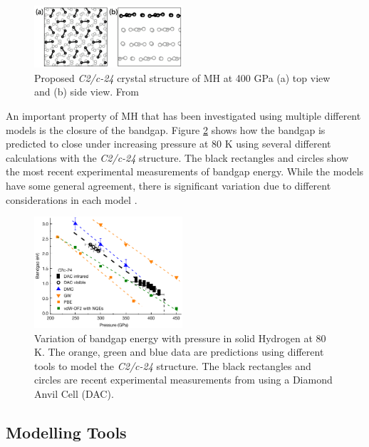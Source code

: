 \documentclass[esp]{FCEFyN-class}
\begin{document}
\begin{figure}[H]
\centering
\includegraphics[width=0.49\textwidth]{cristal.png}
\caption{\label{fig:crystal}Proposed \textit{C2/c-24} crystal structure of MH at 400 GPa (a) top view and (b) side view. From \cite{Dogan2020}}
\end{figure}
\vspace{3mm} %
An important property of MH that has been investigated using multiple different models is the closure of the bandgap. Figure \ref{fig:bandgap} shows how the bandgap is predicted to close under increasing pressure at 80 K using several different calculations with the \textit{C2/c-24} structure. The black rectangles and circles show the most recent experimental measurements of bandgap energy. While the models have some general agreement, there is significant variation due to different considerations in each model \cite{Morales2013}.

\begin{figure}[H]
\centering
\includegraphics[width=0.49\textwidth]{bandgap.pdf}
\caption{\label{fig:bandgap} Variation of bandgap energy with pressure in solid Hydrogen at 80 K. The orange, green and blue data are predictions using different tools to model the \textit{C2/c-24} structure. The black rectangles and circles are recent experimental measurements from \cite{loubeyre2020} using a Diamond Anvil Cell (DAC).}
\end{figure}
\vspace{2mm} %

\subsection{Modelling Tools}
\end{document}
